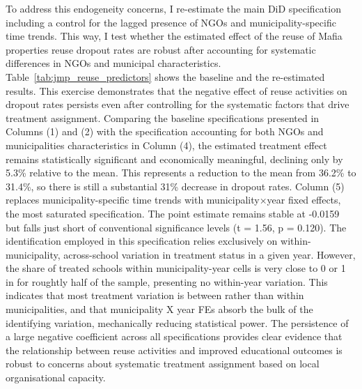 \documentclass[12pt]{article}
\theoremstyle{plain}
\theoremstyle{plain}
\theoremstyle{plain}
\theoremstyle{definition}
\theoremstyle{plain}
\theoremstyle{definition}
\theoremstyle{plain}
\theoremstyle{remark}
\theoremstyle{definition}
\theoremstyle{definition}
\theoremstyle{plain}
\begin{document}
To address this endogeneity concerns, I re-estimate the main DiD specification including a control for the lagged presence of NGOs and municipality-specific time trends. This way, I test whether the estimated effect of the reuse of Mafia properties reuse dropout rates are robust after accounting for systematic differences in NGOs and municipal characteristics. Table~\ref{tab:jmp_reuse_predictors} shows the baseline and the re-estimated results. This exercise demonstrates that the negative effect of reuse activities on dropout rates persists even after controlling for the systematic factors that drive treatment assignment. Comparing the baseline specifications presented in Columns (1) and (2) with the specification accounting for both NGOs and municipalities characteristics in Column (4), the estimated treatment effect remains statistically significant and economically meaningful, declining only by  5.3\% relative to the mean. This represents a reduction to the mean from 36.2\% to 31.4\%, so there is still a substantial 31\% decrease in dropout rates. Column (5) replaces municipality-specific time trends with municipality×year fixed effects, the most saturated specification. The point estimate remains stable at -0.0159 but falls just short of conventional significance levels (t = 1.56, p = 0.120). The identification employed in this specification relies exclusively on within-municipality, across-school variation in treatment status in a given year. However, the share of treated schools within municipality-year cells is very close to 0 or 1 in for roughtly half of the sample, presenting no within-year variation. This indicates that most treatment variation is between rather than within municipalities, and that municipality X year FEs absorb the bulk of the identifying variation, mechanically reducing statistical power. The persistence of a large negative coefficient across all specifications provides clear evidence that the relationship between reuse activities and improved educational outcomes is robust to concerns about systematic treatment assignment based on local organisational capacity.
\end{document}

